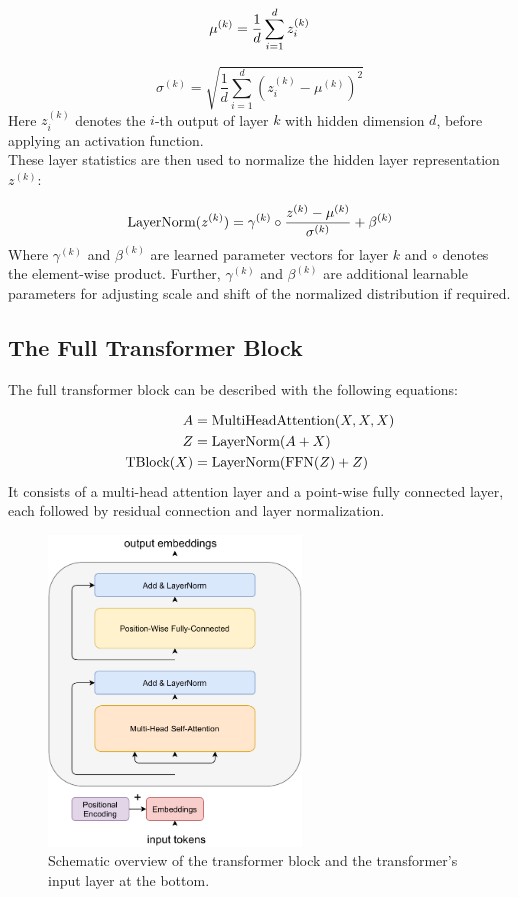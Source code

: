 \begin{equation}
    \mu^{(k)} = \frac{1}{d} \sum_{i=1}^d z_i^{(k)}
\end{equation}

\begin{equation}
    \sigma^{(k)} = \sqrt{\frac{1}{d} \sum_{i=1}^d (z_i^{(k)} - \mu^{(k)})^2}
\end{equation}
Here $z_i^{(k)}$ denotes the $i$-th output of layer $k$ with hidden dimension $d$, before applying an activation function.\\
These layer statistics are then used to normalize the hidden layer representation $z^{(k)}$:

\begin{equation}
    \text{LayerNorm}(z^{(k)}) = \gamma ^{(k)} \circ \frac{z^{(k)} - \mu^{(k)}}{\sigma^{(k)}} + \beta^{(k)}
\end{equation}
Where $\gamma^{(k)}$ and $\beta^{(k)}$ are learned parameter vectors for layer $k$ and $\circ$ denotes the element-wise product. Further, $\gamma^{(k)}$ and $\beta^{(k)}$ are additional learnable parameters for adjusting scale and shift of the normalized distribution if required.

\subsection{The Full Transformer Block}

The full transformer block can be described with the following equations:

\begin{align}
    A              & = \text{MultiHeadAttention}(X, X, X) \\
    Z              & = \text{LayerNorm}(A + X)            \\
    \text{TBlock}(X) & = \text{LayerNorm}(\text{FFN}(Z) + Z)
\end{align}
It consists of a multi-head attention layer and a point-wise fully connected layer, each followed by residual connection and layer normalization.

\begin{figure}[h]
    \centering
    \includegraphics[width=0.6\textwidth]{gfx/transformer}
    \caption{Schematic overview of the transformer block and the transformer's input layer at the bottom.}
\end{figure}



